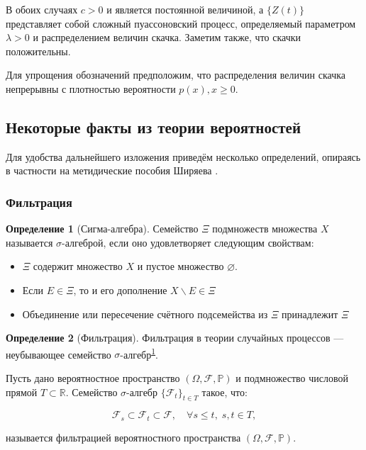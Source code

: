 \documentclass[a4paper,12pt]{article}
\theoremstyle{definition}
\newtheorem{definition}{Определение}[section]
\begin{document}
В обоих случаях $c > 0$ и является постоянной величиной, а $\{Z(t)\}$ представляет собой сложный пуассоновский процесс, определяемый параметром $\lambda > 0$ и распределением величин скачка. Заметим также, что скачки положительны.

\label{sec:positivityOfJumsAssumption} Для упрощения обозначений предположим, что распределения величин скачка
непрерывны с плотностью вероятности $p(x), x \ge 0$. 

\subsection{Некоторые факты из теории вероятностей}

Для удобства дальнейшего изложения приведём несколько определений, опираясь в частности на метидические пособия Ширяева \cite{bib:Shiryaev,bib:Shiryaev_Bulynski}.

\subsubsection{Фильтрация}

\begin{definition}[Сигма-алгебра]
    \label{def:sigma_algebra}
    Семейство $\Xi$ подмножеств множества $X$ называется $\sigma$-алгеброй, если оно удовлетворяет следующим свойствам:
    
    \begin{itemize}
        \item $\Xi$ содержит множество $X$ и пустое множество $\varnothing$.
        \item Если $E \in \Xi$, то и его дополнение $X \backslash E \in \Xi$
        \item Объединение или пересечение счётного подсемейства из $\Xi$ принадлежит $\Xi$
    \end{itemize}

\end{definition}

\begin{definition}[Фильтрация]
    \label{def:filtration}
    Фильтрация в теории случайных процессов — неубывающее семейство $\sigma$-алгебр\textsuperscript{\ref{def:sigma_algebra}}.
    
    Пусть дано вероятностное пространство $(\Omega,{\mathcal {F}},\mathbb {P})$ и подмножество числовой прямой $T\subset \mathbb {R}$. Семейство $\sigma$-алгебр $\{\mathcal {F}_{t}\}_{t\in T}$ такое, что:

    \begin{equation*}
        {\mathcal  {F}}_{s}\subset {\mathcal  {F}}_{t}\subset {\mathcal  {F}},\quad \forall s\leq t,\;s,t\in T,
    \end{equation*}
    
    называется фильтрацией вероятностного пространства $(\Omega,{\mathcal {F}},\mathbb {P})$.

\end{definition}
\end{document}
